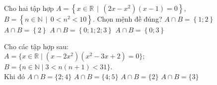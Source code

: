 \begin{ex}%
	Cho hai tập hợp $ A=\left\lbrace x\in \mathbb{R}\,\mid\,(2x-x^2)(x-1)=0 \right\rbrace$, $ B=\left\lbrace n \in \mathbb{N}\,\mid\,0<n^2<10 \right\rbrace$. Chọn  mệnh đề đúng?
	 \choice
		{\True  $A \cap B =\left\lbrace 1;2 \right\rbrace $}
		{$A \cap B  =\left\lbrace 2 \right\rbrace $}
		{ $A \cap B =\left\lbrace 0;1;2;3  \right\rbrace $}
		{$A \cap  B =\left\lbrace 0;3 \right\rbrace $}
\end{ex}

\begin{ex}%
	Cho  các tập hợp sau:\\
	$A=\{x\in\mathbb{R}\mid (x-2x^2)(x^2-3x+2)=0\}$;\\ $B=\{n\in\mathbb{N}\mid 3<n(n+1)<31\}$.\\ 
	Khi đó 
	\choice 
		{$A\cap  B=\{2;4\}$}
		{$A\cap B=\{4;5\}$} 
		{\True  $A\cap B=\{2\}$}
		{$A\cap  B=\{3\}$}
\end{ex}

